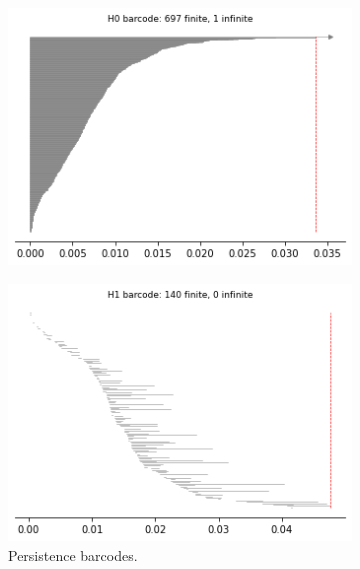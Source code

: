 \begin{figure}[H]
\begin{subfigure}[b]{0.25\textwidth}
\end{subfigure}
\begin{subfigure}[b]{0.24\textwidth}
    \includegraphics[width=\textwidth]{figures/X4_H0_barcode.png}
    \caption{}
\end{subfigure}
\begin{subfigure}[b]{0.24\textwidth}
    \includegraphics[width=\textwidth]{figures/X4_H1_barcode.png}
        \caption{Persistence barcodes.}
\end{subfigure}
\begin{subfigure}[b]{0.24\textwidth}

\end{subfigure}
\end{figure}

